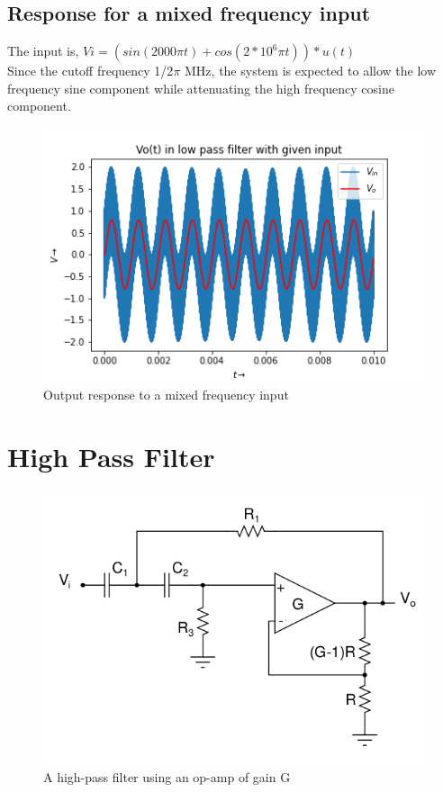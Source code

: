 \documentclass[11pt, a4paper]{article}
\begin{document}
\subsection{Response for a mixed frequency input}
The input is,
$Vi = (sin(2000 \pi t) + cos(2*10^6 \pi t))*u(t)
$
\\
Since the cutoff frequency 1/2$\pi$ MHz, the system is expected to allow the low frequency sine component while attenuating the high frequency cosine component.
\begin{figure}[!tbh]
   	\centering
   	\includegraphics[scale=0.65]{mixed_f_respl.png}  %
   	\caption{Output response to a mixed frequency input}
   	\label{fig:sample}
   \end{figure}
\section{High Pass Filter}
\begin{figure}[!tbh]
   	\centering
   	\includegraphics[scale=0.5]{fig7.png}  %
   	\caption{A high-pass filter using an op-amp of gain G}
   	\label{fig:sample}
   \end{figure}
   
\end{document}
